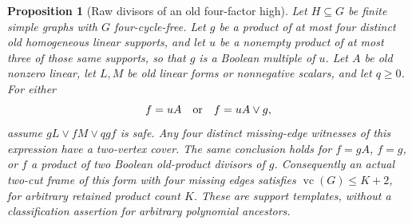 \documentclass[11pt]{article}
\newcommand{\vc}{\operatorname{vc}}
\newtheorem{proposition}[theorem]{Proposition}
\theoremstyle{definition}
\theoremstyle{remark}
\begin{document}
\begin{proposition}[Raw divisors of an old four-factor high]\label{prop:rawdivisor}
Let $H\subseteq G$ be finite simple graphs with $G$ four-cycle-free. Let $g$ be a product of at most four distinct old homogeneous linear supports, and let $u$ be a nonempty product of at most three of those same supports, so that $g$ is a Boolean multiple of $u$. Let $A$ be old nonzero linear, let $L,M$ be old linear forms or nonnegative scalars, and let $q\ge0$. For either
\[
 f=uA\quad\hbox{or}\quad f=uA\vee g,
\]
assume $gL\vee fM\vee qgf$ is safe. Any four distinct missing-edge witnesses of this expression have a two-vertex cover. The same conclusion holds for $f=gA$, $f=g$, or $f$ a product of two Boolean old-product divisors of $g$. Consequently an actual two-cut frame of this form with four missing edges satisfies $\vc(G)\le K+2$, for arbitrary retained product count $K$. These are support templates, without a classification assertion for arbitrary polynomial ancestors.
\end{proposition}
\end{document}
